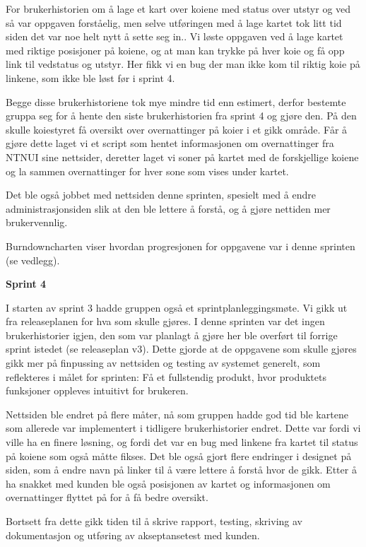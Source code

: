 \documentclass[12pt,a4paper,norsk]{article}
\begin{document}
For brukerhistorien om å lage et kart over koiene med status over utstyr og ved så var oppgaven forståelig, men selve utføringen med å lage kartet tok litt tid siden det var noe helt nytt å sette seg in.. Vi løste oppgaven ved å lage kartet med riktige posisjoner på koiene, og at man kan trykke på hver koie og få opp link til vedstatus og utstyr. Her fikk vi en bug der man ikke kom til riktig koie på linkene, som ikke ble løst før i sprint 4.   

Begge disse brukerhistoriene tok mye mindre tid enn estimert, derfor bestemte gruppa seg for å hente den siste brukerhistorien fra sprint 4 og gjøre den. På den skulle koiestyret få oversikt over overnattinger på koier i et gikk område. Får å gjøre dette laget vi et script som hentet informasjonen om overnattinger fra NTNUI sine nettsider, deretter laget vi soner på kartet med de forskjellige koiene og la sammen overnattinger for hver sone som vises under kartet. 

Det ble også jobbet med nettsiden denne sprinten, spesielt med å endre administrasjonsiden slik at den ble lettere å forstå, og å gjøre nettiden mer brukervennlig.  

Burndowncharten viser hvordan progresjonen for oppgavene var i denne sprinten (se vedlegg).

\bigskip \noindent \textbf{Sprint 4}
\par I starten av sprint 3 hadde gruppen også et sprintplanleggingsmøte. Vi gikk ut fra releaseplanen for hva som skulle gjøres. I denne sprinten var det ingen brukerhistorier igjen, den som var planlagt å gjøre her ble overført til forrige sprint istedet (se releaseplan v3). Dette gjorde at de oppgavene som skulle gjøres gikk mer på finpussing av nettsiden og testing av systemet generelt, som reflekteres i målet for sprinten: Få et fullstendig produkt, hvor produktets funksjoner oppleves intuitivt for brukeren.

Nettsiden ble endret på flere måter, nå som gruppen hadde god tid ble kartene som allerede var implementert i tidligere brukerhistorier endret. Dette var fordi vi ville ha en finere løsning, og fordi det var en bug med linkene fra kartet til status på koiene som også måtte fikses. Det ble også gjort flere endringer i designet på siden, som å endre navn på linker til å være lettere å forstå hvor de gikk. Etter å ha snakket med kunden ble også posisjonen av kartet og informasjonen om overnattinger flyttet på for å få bedre oversikt. 

Bortsett fra dette gikk tiden til å skrive rapport, testing, skriving av dokumentasjon og utføring av akseptansetest med kunden. 
\end{document}
